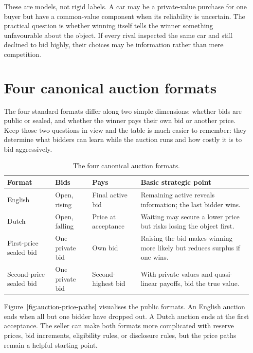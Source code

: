 These are models, not rigid labels. A car may be a private-value purchase for
one buyer but have a common-value component when its reliability is uncertain.
The practical question is whether winning itself tells the winner something
unfavourable about the object. If every rival inspected the same car and still
declined to bid highly, their choices may be information rather than mere
competition.

\section{Four canonical auction formats}

The four standard formats differ along two simple dimensions: whether bids are
public or sealed, and whether the winner pays their own bid or another price.
Keep those two questions in view and the table is much easier to remember:
they determine what bidders can learn while the auction runs and how costly it
is to bid aggressively.

\begin{table}[htbp]
  \centering
  \small
  \renewcommand{\arraystretch}{1.18}
  \begin{tabular}{@{}p{1.85cm}p{1.75cm}p{1.75cm}p{5.00cm}@{}}
    \toprule
    Format & Bids & Pays & Basic strategic point\\
    \midrule
    English & Open, rising & Final active bid & Remaining active reveals information; the last bidder wins.\\
    Dutch & Open, falling & Price at acceptance & Waiting may secure a lower price but risks losing the object first.\\
    First-price sealed bid & One private bid & Own bid & Raising the bid makes winning more likely but reduces surplus if one wins.\\
    Second-price sealed bid & One private bid & Second-highest bid & With private values and quasi-linear payoffs, bid the true value.\\
    \bottomrule
  \end{tabular}
  \caption{The four canonical auction formats.}
  \label{tab:auction-formats}
\end{table}
\FloatBarrier

Figure~\ref{fig:auction-price-paths} visualises the public formats. An English
auction ends when all but one bidder have dropped out. A Dutch auction ends at
the first acceptance. The seller can make both formats more complicated with
reserve prices, bid increments, eligibility rules, or disclosure rules, but
the price paths remain a helpful starting point.

